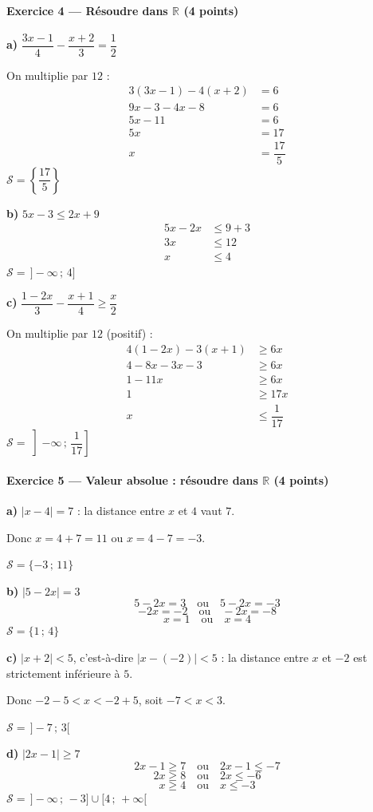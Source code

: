 \documentclass[11pt,a4paper]{article}
\newcommand{\R}{\mathbb{R}}
\renewcommand{\S}{\mathcal{S}}
\newcommand{\exo}[3]{\paragraph{Exercice #1 --- #2 \hfill\normalfont\small(#3 points)}}
\newcommand{\rep}[1]{\textbf{#1}}
\begin{document}
\exo{4}{Résoudre dans $\R$}{4}
\begin{minipage}[t]{0.31\linewidth}
\rep{a)} $\dfrac{3x-1}{4} - \dfrac{x+2}{3} = \dfrac{1}{2}$

On multiplie par $12$ :
\begin{align*}
3(3x-1) - 4(x+2) &= 6\\
9x - 3 - 4x - 8 &= 6\\
5x - 11 &= 6\\
5x &= 17\\
x &= \dfrac{17}{5}
\end{align*}
$\S = \left\{\dfrac{17}{5}\right\}$

\end{minipage}\hfill
\begin{minipage}[t]{0.31\linewidth}
\rep{b)} $5x - 3 \leqslant 2x + 9$
\begin{align*}
5x - 2x &\leqslant 9 + 3\\
3x &\leqslant 12\\
x &\leqslant 4
\end{align*}
$\S = \,]-\infty\,;\,4]$

\end{minipage}\hfill
\begin{minipage}[t]{0.31\linewidth}
\rep{c)} $\dfrac{1-2x}{3} - \dfrac{x+1}{4} \geqslant \dfrac{x}{2}$

On multiplie par $12$ (positif) :
\begin{align*}
4(1-2x) - 3(x+1) &\geqslant 6x\\
4 - 8x - 3x - 3 &\geqslant 6x\\
1 - 11x &\geqslant 6x\\
1 &\geqslant 17x\\
x &\leqslant \dfrac{1}{17}
\end{align*}
$\S = \left]-\infty\,;\,\dfrac{1}{17}\right]$
\end{minipage}

\exo{5}{Valeur absolue : résoudre dans $\R$}{4}
\begin{minipage}[t]{0.47\linewidth}
\rep{a)} $|x - 4| = 7$ : la distance entre $x$ et $4$ vaut $7$.

Donc $x = 4 + 7 = 11$ ou $x = 4 - 7 = -3$.

$\S = \{-3\,;\,11\}$

\medskip
\rep{b)} $|5 - 2x| = 3$
\[ 5 - 2x = 3 \quad\text{ou}\quad 5 - 2x = -3 \]
\[ -2x = -2 \quad\text{ou}\quad -2x = -8 \]
\[ x = 1 \quad\text{ou}\quad x = 4 \]
$\S = \{1\,;\,4\}$

\end{minipage}\hfill
\begin{minipage}[t]{0.47\linewidth}
\rep{c)} $|x + 2| < 5$, c'est-à-dire $|x - (-2)| < 5$ : la distance entre $x$ et $-2$ est strictement inférieure à $5$.

Donc $-2 - 5 < x < -2 + 5$, soit $-7 < x < 3$.

$\S = \,]-7\,;\,3[$

\medskip
\rep{d)} $|2x - 1| \geqslant 7$
\[ 2x - 1 \geqslant 7 \quad\text{ou}\quad 2x - 1 \leqslant -7 \]
\[ 2x \geqslant 8 \quad\text{ou}\quad 2x \leqslant -6 \]
\[ x \geqslant 4 \quad\text{ou}\quad x \leqslant -3 \]
$\S = \,]-\infty\,;\,-3] \cup [4\,;\,+\infty[$
\end{minipage}
\end{document}
